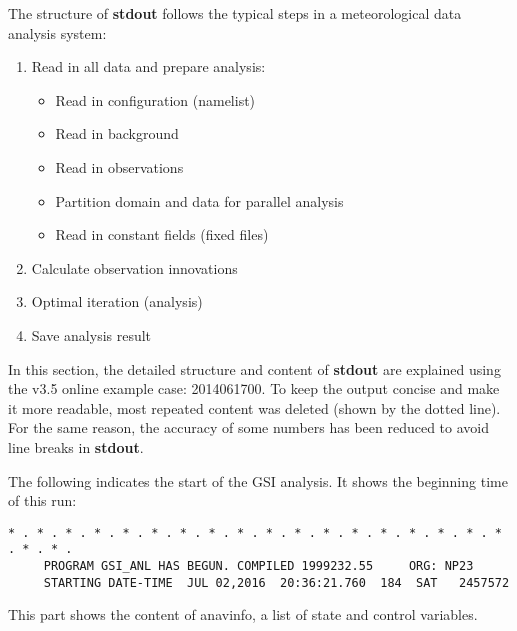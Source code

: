 The structure of \textbf{stdout} follows the typical steps in a meteorological data analysis system:

\begin{enumerate}
\item Read in all data and prepare analysis:
\begin{itemize}
\item Read in configuration (namelist)
\item Read in background
\item Read in observations
\item Partition domain and data for parallel analysis
\item Read in constant fields (fixed files)
\end{itemize}
\item Calculate observation innovations
\item Optimal iteration (analysis)
\item Save analysis result
\end{enumerate}

In this section, the detailed structure and content of \textbf{stdout} are explained using the v3.5 online example case: 2014061700. To keep the output concise and make it more readable, most repeated content was deleted (shown by the dotted line). For the same reason, the accuracy of some numbers has been reduced to avoid line breaks in \textbf{stdout}.

The following indicates the start of the GSI analysis. It shows the beginning time of this run:

\begin{scriptsize}
\begin{verbatim}
* . * . * . * . * . * . * . * . * . * . * . * . * . * . * . * . * . * . * . * .
     PROGRAM GSI_ANL HAS BEGUN. COMPILED 1999232.55     ORG: NP23
     STARTING DATE-TIME  JUL 02,2016  20:36:21.760  184  SAT   2457572
\end{verbatim}
\end{scriptsize}

This part shows the content of anavinfo, a list of state and control variables.

